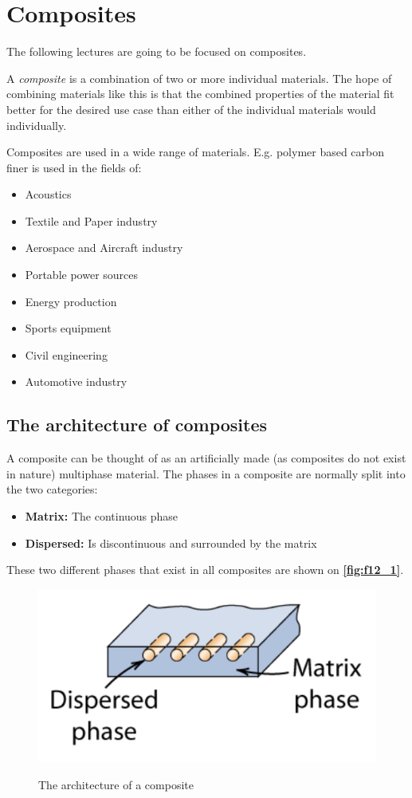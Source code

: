
\section{Composites}
The following lectures are going to be focused on composites.
\begin{definition}[Composites]
  A \textit{composite} is a combination of two or more individual materials. The hope of combining materials like this is that the combined properties of the material fit better for the desired use case than either of the individual materials would individually. 
\end{definition}
Composites are used in a wide range of materials. E.g. polymer based carbon finer is used in the fields of:
\begin{itemize}
  \item Acoustics
  \item Textile and Paper industry
  \item Aerospace and Aircraft industry
  \item Portable power sources
  \item Energy production
  \item Sports equipment
  \item Civil engineering
  \item Automotive industry
\end{itemize}

\subsection{The architecture of composites}
A composite can be thought of as an artificially made (as composites do not exist in nature) multiphase material. The phases in a composite are normally split into the two categories:
\begin{itemize}
  \item \textbf{Matrix:} The continuous phase
  \item \textbf{Dispersed:} Is discontinuous and surrounded by the matrix
\end{itemize}
These two different phases that exist in all composites are shown on \textbf{\autoref{fig:f12_1}}.
\begin{figure} [ht]
  \centering
  \caption{The architecture of a composite}
  \includegraphics[width=0.25\linewidth]{./figures/f12_1.png}
  \label{fig:f12_1}
\end{figure}

